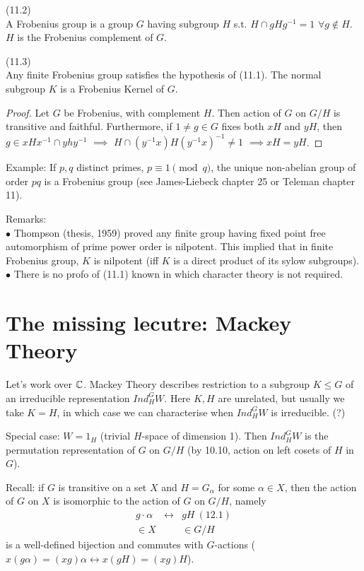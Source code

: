 \documentclass[a4paper]{article}
\begin{document}
\begin{defi} (11.2)\\
A Frobenius group is a group $G$ having subgroup $H$ s.t. $H \cap gHg^{-1} = 1$ $\forall g \not\in H$.\\
$H$ is the Frobenius complement of $G$.
\end{defi}

\begin{prop} (11.3)\\
Any finite Frobenius group satisfies the hypothesis of (11.1). The normal subgroup $K$ is a Frobenius Kernel of $G$.
\begin{proof}
Let $G$ be Frobenius, with complement $H$. Then action of $G$ on $G/H$ is transitive and faithful. Furthermore, if $1 \neq g \in G$ fixes both $xH$ and $yH$, then $g \in xHx^{-1} \cap yhy^{-1}$ $\implies$ $H \cap (y^{-1} x) H (y^{-1}x)^{-1} \neq 1$ $\implies xH = yH$.
\end{proof}
\end{prop}

Example: If $p,q$ distinct primes, $p \equiv 1 \pmod q$, the unique non-abelian group of order $pq$ is a Frobenius group (see James-Liebeck chapter 25 or Teleman chapter 11).

Remarks:\\
$\bullet$ Thompson (thesis, 1959) proved any finite group having fixed point free automorphism of prime power order is nilpotent. This implied that in finite Frobenius group, $K$ is nilpotent (iff $K$ is a direct product of its sylow subgroups).\\
$\bullet$ There is no profo of (11.1) known in which character theory is not required.

\newpage
\section{The missing lecutre: Mackey Theory}
Let's work over $\mathbb{C}$. Mackey Theory describes restriction to a subgroup $K \leq G$ of an irreducible representation $Ind_H^G W$. Here $K,H$ are unrelated, but usually we take $K=H$, in which case we can characterise when $Ind_H^G W$ is irreducible. (?)

Special case: $W=1_H$ (trivial $H$-space of dimension 1). Then $Ind_H^G W$ is the permutation representation of $G$ on $G/H$ (by 10.10, action on left cosets of $H$ in $G$).

Recall: if $G$ is transitive on a set $X$ and $H=G_\alpha$ for some $\alpha \in X$, then the action of $G$ on $X$ is isomorphic to the action of $G$ on $G/H$, namely
\begin{equation*}
\begin{aligned}
g \cdot \alpha & \leftrightarrow &gH \ (12.1)\\
\in X & & \in G/H
\end{aligned}
\end{equation*}
is a well-defined bijection and commutes with $G$-actions ($x(g\alpha) = (xg)\alpha \leftrightarrow x(gH) = (xg)H$).
\end{document}
